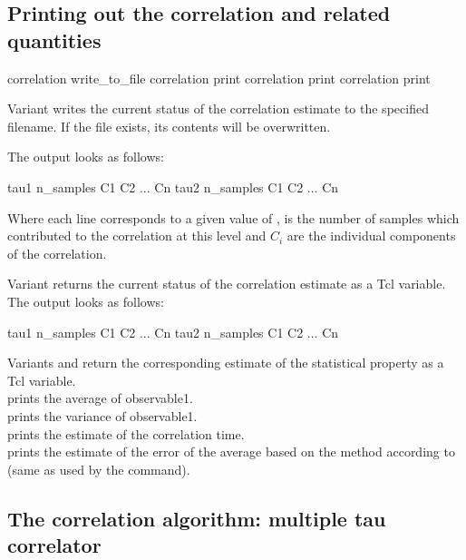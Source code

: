 \subsection{Printing out the correlation and related quantities}
\label{ssec:CorrError}
\begin{essyntax}
 correlation  write_to_file 
 correlation  print 
 correlation  print  
 correlation  print 
\end{essyntax}

Variant  writes the current status of the correlation
estimate to the specified filename. If the file exists, its contents will
be overwritten.

The output looks as follows:
\begin{code}
tau1 n_samples C1 C2 ... Cn
tau2 n_samples C1 C2 ... Cn
\end{code}
Where each line corresponds to a given value of ,  is the number
of samples which contributed to the correlation at this level and $C_i$ are the individual
components of the correlation.

Variant  returns the current status of the correlation
estimate as a Tcl variable. 
The output looks as follows:
\begin{code}
{ tau1 n_samples C1 C2 ... Cn }
{ tau2 n_samples C1 C2 ... Cn }
\end{code}

Variants  and  return the corresponding
estimate of the statistical property as a Tcl variable.             \\
 prints the average of observable1.                   \\
 prints the variance of observable1.                 \\
 prints the estimate of the correlation time. \\
 prints the estimate of the error of the average based
on the method according to~\cite{wolff04a} (same as 
used by the  command). 


\subsection{The correlation algorithm: multiple tau correlator}
\label{sec:multipleTau}

